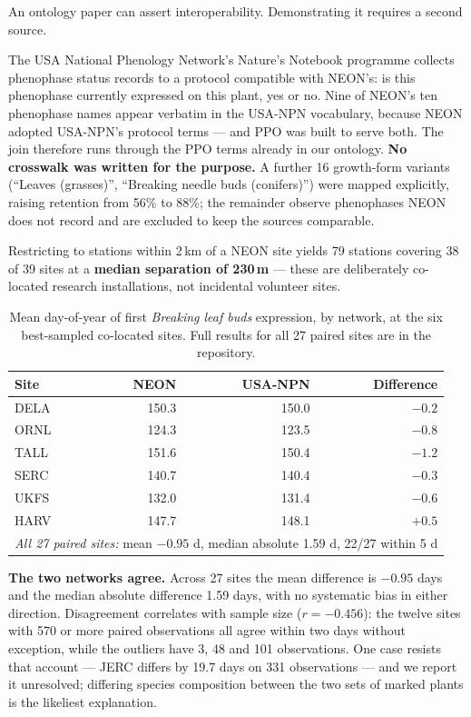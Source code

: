 An ontology paper can assert interoperability. Demonstrating it requires a
second source.

The USA National Phenology Network's Nature's Notebook programme collects
phenophase status records to a protocol compatible with NEON's: is this
phenophase currently expressed on this plant, yes or no. Nine of NEON's ten
phenophase names appear verbatim in the USA-NPN vocabulary, because NEON adopted
USA-NPN's protocol terms --- and PPO was built to serve both. The join therefore
runs through the PPO terms already in our ontology. \textbf{No crosswalk was
written for the purpose.} A further 16 growth-form variants
(``Leaves (grasses)'', ``Breaking needle buds (conifers)'') were mapped
explicitly, raising retention from 56\% to 88\%; the remainder observe
phenophases NEON does not record and are excluded to keep the sources
comparable.

Restricting to stations within 2\,km of a NEON site yields 79 stations covering
38 of 39 sites at a \textbf{median separation of 230\,m} --- these are
deliberately co-located research installations, not incidental volunteer sites.

\begin{table}[t]
\centering
\caption{Mean day-of-year of first \emph{Breaking leaf buds} expression, by
network, at the six best-sampled co-located sites. Full results for all 27
paired sites are in the repository.}
\label{tab:agreement}
\small
\begin{tabular}{lrrr}
\toprule
\textbf{Site} & \textbf{NEON} & \textbf{USA-NPN} & \textbf{Difference} \\
\midrule
DELA & 150.3 & 150.0 & $-0.2$ \\
ORNL & 124.3 & 123.5 & $-0.8$ \\
TALL & 151.6 & 150.4 & $-1.2$ \\
SERC & 140.7 & 140.4 & $-0.3$ \\
UKFS & 132.0 & 131.4 & $-0.6$ \\
HARV & 147.7 & 148.1 & $+0.5$ \\
\midrule
\multicolumn{4}{l}{\emph{All 27 paired sites:} mean $-0.95$ d, median
absolute 1.59 d, 22/27 within 5 d} \\
\bottomrule
\end{tabular}
\end{table}

\textbf{The two networks agree.} Across 27 sites the mean difference is
$-0.95$ days and the median absolute difference 1.59 days, with no systematic
bias in either direction. Disagreement correlates with sample size
($r=-0.456$): the twelve sites with 570 or more paired observations all agree
within two days without exception, while the outliers have 3, 48 and 101
observations. One case resists that account --- JERC differs by 19.7 days on
331 observations --- and we report it unresolved; differing species composition
between the two sets of marked plants is the likeliest explanation.

